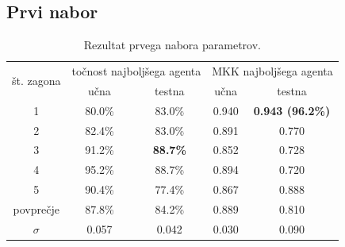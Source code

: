 \subsection{Prvi nabor}\label{subsec:dodatek-wine-prvi-nabor}
\begin{table}[H]
    \begin{center}
        \begin{tabular}{|| c | c c || c c ||}
            \hline
            \multirow{2}{*}{št. zagona} & \multicolumn{2}{c||}{točnost najboljšega agenta} & \multicolumn{2}{c||}{MKK najboljšega agenta} \\ \cline{2-5}
            & učna   & testna          & učna  & testna                  \\
            \hline
            1         & 80.0\% & 83.0\%          & 0.940 & \textbf{0.943 (96.2\%)} \\
            \hline
            2         & 82.4\% & 83.0\%          & 0.891 & 0.770                   \\
            \hline
            3         & 91.2\% & \textbf{88.7\%} & 0.852 & 0.728                   \\
            \hline
            4         & 95.2\% & 88.7\%          & 0.894 & 0.720                   \\
            \hline
            5         & 90.4\% & 77.4\%          & 0.867 & 0.888                   \\
            \hline
            povprečje & 87.8\% & 84.2\%          & 0.889 & 0.810                   \\
            \hline
            $\sigma$  & 0.057  & 0.042           & 0.030 & 0.090                   \\
            \hline
        \end{tabular}
    \end{center}
    \caption{Rezultat prvega nabora parametrov.}
    \label{tab:wine_result_1}
\end{table}

